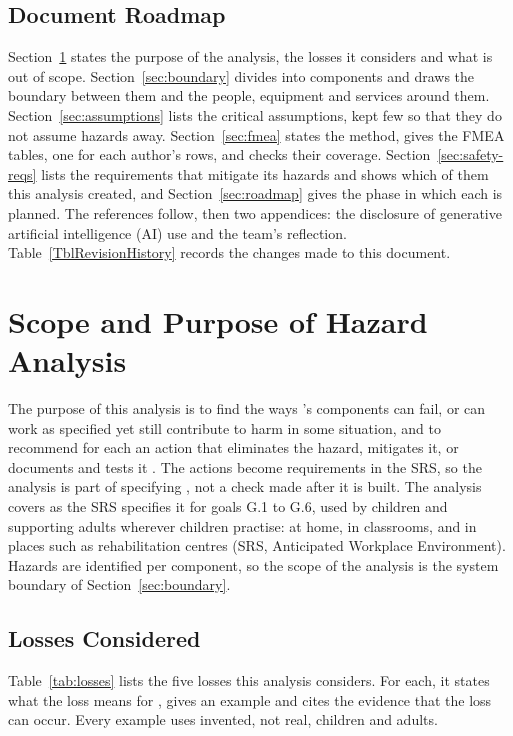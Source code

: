 \documentclass{article}
\begin{document}
\subsection{Document Roadmap}

Section~\ref{sec:scope} states the purpose of the analysis, the losses it
considers and what is out of scope. Section~\ref{sec:boundary} divides
\progname{} into components and draws the boundary between them and the people,
equipment and services around them. Section~\ref{sec:assumptions} lists the
critical assumptions, kept few so that they do not assume hazards away.
Section~\ref{sec:fmea} states the method, gives the FMEA tables, one for each
author's rows, and checks their coverage. Section~\ref{sec:safety-reqs} lists
the requirements that mitigate its hazards and shows which of them this
analysis created, and
Section~\ref{sec:roadmap} gives the phase in which each is planned. The
references follow, then two appendices: the disclosure of generative artificial
intelligence (AI) use and the team's reflection. Table~\ref{TblRevisionHistory}
records the changes made to this document.

\section{Scope and Purpose of Hazard Analysis}\label{sec:scope}

The purpose of this analysis is to find the ways \progname{}'s components can
fail, or can work as specified yet still contribute to harm in some situation,
and to recommend for each an action that eliminates the hazard, mitigates it, or
documents and tests it \citep{Smith2026L08}. The actions become requirements in
the SRS, so the analysis is part of specifying \progname{}, not a check made
after it is built. The analysis covers \progname{} as the SRS specifies it for
goals G.1 to G.6, used by children and supporting adults wherever children
practise: at home, in classrooms, and in places such as rehabilitation centres
(SRS, Anticipated Workplace Environment). Hazards are identified per component,
so the scope of the analysis is the system boundary of
Section~\ref{sec:boundary}.

\subsection{Losses Considered}

Table~\ref{tab:losses} lists the five losses this analysis considers. For each,
it states what the loss means for \progname{}, gives an example and cites the
evidence that the loss can occur. Every example uses invented, not real,
children and adults.
\end{document}
